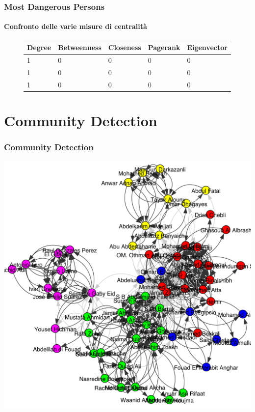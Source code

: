 \documentclass[hyperref={pdfpagelabels=false}]{beamer}
\begin{document}




\begin{frame}
\frametitle{Most Dangerous Persons}
\framesubtitle{Confronto delle varie misure di centralità}

\begin{figure}[H]
	\centering
	\begin{tabular}{l l l l l}
		\toprule         
		\textbf{Degree}& \textbf{Betweenness} & \textbf{Closeness} & 
		\textbf{Pagerank}& \textbf{Eigenvector}\\
		\midrule
		1 & 0 & 0 & 0 & 0 \\
		1 & 0 & 0 & 0 & 0 \\
		1 & 0 & 0 & 0 & 0 \\
		\bottomrule
	\end{tabular}
	\label{tab:most_dangerous}
\end{figure}

\end{frame}

\section{Community Detection}

\begin{frame}
\frametitle{Community Detection}
\centering
\includegraphics[scale=0.35]{images/community-partition.pdf}
\end{frame}
\end{document}
